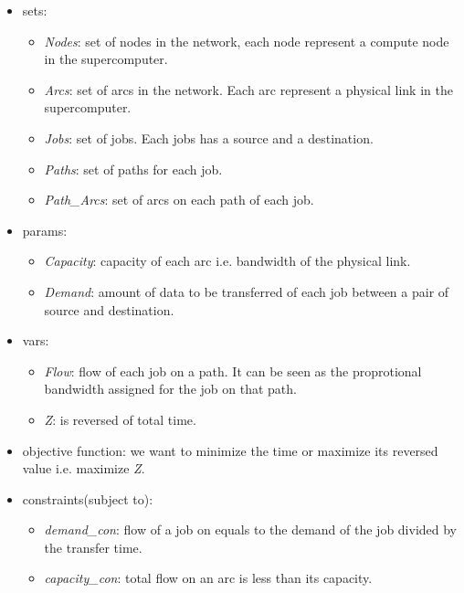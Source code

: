 \begin{itemize}
    \item sets: 
	\begin{itemize}
	    \item \textit{Nodes}: set of nodes in the network, each node represent a compute node in the supercomputer.
	    \item \textit{Arcs}: set of arcs in the network. Each arc represent a physical link in the supercomputer.
	    \item \textit{Jobs}: set of jobs. Each jobs has a source and a destination.
	    \item  \textit{Paths}: set of paths for each job.
	    \item \textit{Path\_Arcs}: set of arcs on each path of each job.
	\end{itemize}
    \item params: 
	\begin{itemize}
	    \item {\it Capacity}: capacity of each arc i.e. bandwidth of the physical link.
	    \item {\it Demand}: amount of data to be transferred of each job between a pair of source and destination.
	\end{itemize}
    \item vars:
	 \begin{itemize}
	    \item \textit{Flow}: flow of each job on a path. It can be seen as the proprotional bandwidth assigned for the job on that path.
	    \item \textit{Z}: is reversed of total time.
	\end{itemize}
    \item objective function: we want to minimize the time or maximize its reversed value i.e. maximize \textit{Z}.
    \item constraints(subject to): 
	\begin{itemize}
	    \item \textit{demand\_con}: flow of a job on equals to the demand of the job divided by the transfer time.
	    \item \textit{capacity\_con}: total flow on an arc is less than its capacity.
	\end{itemize}
\end{itemize}
